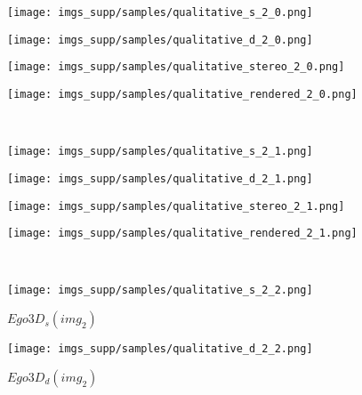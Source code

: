 \documentclass[10pt,twocolumn,letterpaper]{article}
\begin{document}
\appendix
\renewcommand\thefigure{\thesection\arabic{figure}}
\setcounter{figure}{1}
\begin{figure*}[h]
  \begin{subfigure}[t]{0.29283019\linewidth}
    \texttt{[image: imgs\_supp/samples/qualitative\_s\_2\_0.png]}
  \end{subfigure}
  \begin{subfigure}[t]{0.29283019\linewidth}
    \texttt{[image: imgs\_supp/samples/qualitative\_d\_2\_0.png]}
  \end{subfigure}
  \begin{subfigure}[t]{0.21962264\linewidth}
    \texttt{[image: imgs\_supp/samples/qualitative\_stereo\_2\_0.png]}
  \end{subfigure}
  \begin{subfigure}[t]{0.16471698\linewidth}
    \texttt{[image: imgs\_supp/samples/qualitative\_rendered\_2\_0.png]}
  \end{subfigure}\\
  \begin{subfigure}[t]{0.29283019\linewidth}
    \texttt{[image: imgs\_supp/samples/qualitative\_s\_2\_1.png]}
  \end{subfigure}
  \begin{subfigure}[t]{0.29283019\linewidth}
    \texttt{[image: imgs\_supp/samples/qualitative\_d\_2\_1.png]}
  \end{subfigure}
  \begin{subfigure}[t]{0.21962264\linewidth}
    \texttt{[image: imgs\_supp/samples/qualitative\_stereo\_2\_1.png]}
  \end{subfigure}
  \begin{subfigure}[t]{0.16471698\linewidth}
    \texttt{[image: imgs\_supp/samples/qualitative\_rendered\_2\_1.png]}
  \end{subfigure}\\
  \begin{subfigure}[t]{0.29283019\linewidth}
    \texttt{[image: imgs\_supp/samples/qualitative\_s\_2\_2.png]}
    \caption{$Ego3D_{s} (img_{2})$}\label{fig:qualitative_ego_s}
  \end{subfigure}
  \begin{subfigure}[t]{0.29283019\linewidth}
    \texttt{[image: imgs\_supp/samples/qualitative\_d\_2\_2.png]}
    \caption{$Ego3D_{d} (img_{2})$}\label{fig:qualitative_ego_d}
  \end{subfigure}

\end{figure*}
\end{document}

